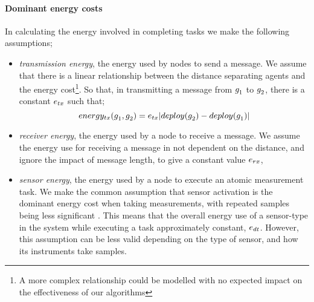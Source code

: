 \paragraph{Dominant energy costs}
\label{section:problem:dominant_energy_costs}
\newcommand{\formalTransmissionEnergy}[2]{
	\functionFormal{energy_{\symbolTransmission{}{}}}
	{\setAgent{}{} \times \setAgent{}{}}
	{\setRealNumbersPositive{}{}}
}
\newcommand{\functionTransmissionEnergy}[2]{
	\functionSignature{energy_{\symbolTransmission{}{}}}
	{\varAgent{#1}{},\varAgent{#2}{}}
}
\newcommand{\functionTransmissionEnergyIndexed}[2]{
	\functionTransmissionEnergy{\varAgent{i}{}}{\varAgent{i+1}{}}
}
\newcommand{\functionTransmissionEnergySink}[2]{
	\functionSignature{energy_{\symbolTransmission{}{}}}
	{\functionSinkRoleAtomic{}{},\varAgent{2}{}}
}
\newcommand{\functionTransmissionEnergyRelay}[2]{
	\functionSignature{energy_{\symbolTransmission{}{}}}
	{\varAgent{#1}{},\varAgent{#2}{}}
}
\newcommand{\functionTransmissionEnergyDetector}[2]{
	\functionSignature{energy_{\symbolTransmission{}{}}}
	{\varAgent{#1}{},\varAgent{#2}{}}
}
In calculating the energy involved in completing tasks we make the following assumptions;
\begin{itemize}
	\item \textit{transmission energy}, the energy used by nodes to send a message. We assume that there is a linear relationship between the distance separating agents and the energy cost\footnote{A more complex relationship could be modelled with no expected impact on the effectiveness of our algorithms}. So that, in transmitting a message from $g_{1}^{}$ to $g_{2}^{}$, there is a constant $\varTransmissionEnergy{}{}$ such that;
	\begin{equation}
		\functionTransmissionEnergy{1}{2}
		=  \varTransmissionEnergy{}{}\funcSize{\functionDeployment{\varAgent{2}{}}{} - \functionDeployment{\varAgent{1}{}}{}}
	\end{equation}
	\item \textit{receiver energy}, the energy used by a node to receive a message. We assume the energy use for receiving a message in not dependent on the distance, and ignore the impact of message length, to give a constant value $\varReceiverEnergy{}{}$, 
	\item \textit{sensor energy}, the energy used by a node to execute an atomic measurement task. We make the common assumption that sensor activation is the dominant energy cost when taking measurements, with repeated samples being less significant \citep{Razzaque2014}. This means that the overall energy use of a sensor-type in the system while executing a task approximately constant, $\varSensorEnergy{}{}$. However, this assumption can be less valid depending on the type of sensor, and how its instruments take samples.
\end{itemize}
